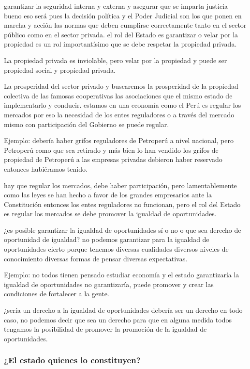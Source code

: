 \documentclass[
  a4paper,
]{article}
\begin{document}
garantizar la seguridad interna y externa y asegurar que se imparta
justicia bueno eso será pues la decisión política y el Poder Judicial
son los que ponen en marcha y acción las normas que deben cumplirse
correctamente tanto en el sector público como en el sector privada. el
rol del Estado es garantizar o velar por la propiedad es un rol
importantísimo que se debe respetar la propiedad privada.

La propiedad privada es inviolable, pero velar por la propiedad y puede
ser propiedad social y propiedad privada.

La prosperidad del sector privado y buscaremos la prosperidad de la
propiedad colectiva de las famosas cooperativas las asociaciones que el
mismo estado de implementarlo y conducir. estamos en una economía como
el Perú es regular los mercados por eso la necesidad de los entes
reguladores o a través del mercado mismo con participación del Gobierno
se puede regular.

Ejemplo: debería haber grifos reguladores de Petroperú a nivel nacional,
pero Petroperú como que sea retirado y más bien lo han vendido los
grifos de propiedad de Petroperú a las empresas privadas debieron haber
reservado entonces hubiéramos tenido.

hay que regular los mercados, debe haber participación, pero
lamentablemente como las leyes se han hecho a favor de los grandes
empresarios ante la Constitución entonces los entes reguladores no
funcionan, pero el rol del Estado es regular los mercados se debe
promover la igualdad de oportunidades.

¿es posible garantizar la igualdad de oportunidades sí o no o que sea
derecho de oportunidad de igualdad? no podemos garantizar para la
igualdad de oportunidades cierto porque tenemos diversas cualidades
diversos niveles de conocimiento diversas formas de pensar diversas
expectativas.

Ejemplo: no todos tienen pensado estudiar economía y el estado
garantizaría la igualdad de oportunidades no garantizaría, puede
promover y crear las condiciones de fortalecer a la gente.

¿sería un derecho a la igualdad de oportunidades debería ser un derecho
en todo caso, no podemos decir que sea un derecho para que en alguna
medida todos tengamos la posibilidad de promover la promoción de la
igualdad de oportunidades.

\subsubsection{¿El estado quienes lo
constituyen?}\label{el-estado-quienes-lo-constituyen}
\end{document}
